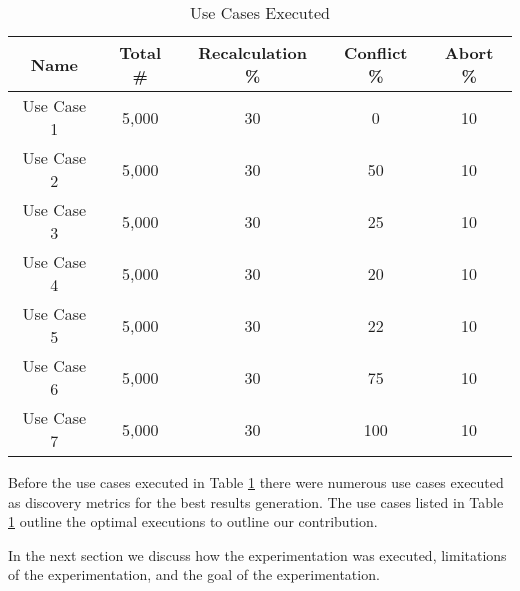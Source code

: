 \begin{table}
\caption{Use Cases Executed}
\captionsetup{justification=centering}
\centering
 \begin{tabular}{|| c | c | c | c | c ||} 
 \hline
 \textbf{Name} & \textbf{Total \#} & \textbf{Recalculation \%} &  \textbf{Conflict \%} & \textbf{Abort \%} \\ [0.5ex] 
 \hline\hline
 Use Case 1 & 5,000 & 30 & 0 & 10  \\ 
 \hline
 Use Case 2 & 5,000 & 30 & 50 & 10  \\ 
 \hline
 Use Case 3 & 5,000 & 30 & 25 & 10  \\ 
 \hline
 Use Case 4 & 5,000 & 30 & 20 & 10  \\ 
 \hline
 Use Case 5 & 5,000 & 30 & 22 & 10  \\ 
 \hline
 Use Case 6 & 5,000 & 30 & 75 & 10  \\ 
 \hline
 Use Case 7 & 5,000 & 30 & 100 & 10  \\ 
 [1ex] 
 \hline
\end{tabular}
\label{tbl:use_cases} %
\end{table}

Before the use cases executed in Table \ref{tbl:use_cases} there were numerous use cases executed as discovery metrics for the best results generation. The use cases listed in Table \ref{tbl:use_cases} outline the optimal executions to outline our contribution.

In the next section we discuss how the experimentation was executed, limitations of the experimentation, and the goal of the experimentation.